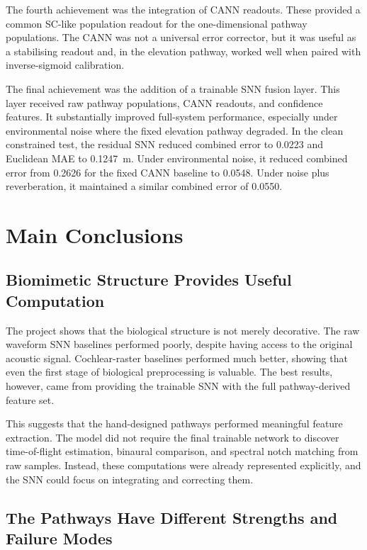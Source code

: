 The fourth achievement was the integration of CANN readouts. These provided a common SC-like population readout for the one-dimensional pathway populations. The CANN was not a universal error corrector, but it was useful as a stabilising readout and, in the elevation pathway, worked well when paired with inverse-sigmoid calibration.

The final achievement was the addition of a trainable SNN fusion layer. This layer received raw pathway populations, CANN readouts, and confidence features. It substantially improved full-system performance, especially under environmental noise where the fixed elevation pathway degraded. In the clean constrained test, the residual SNN reduced combined error to 0.0223 and Euclidean MAE to 0.1247~m. Under environmental noise, it reduced combined error from 0.2626 for the fixed CANN baseline to 0.0548. Under noise plus reverberation, it maintained a similar combined error of 0.0550.

\section{Main Conclusions}

\subsection{Biomimetic Structure Provides Useful Computation}

The project shows that the biological structure is not merely decorative. The raw waveform SNN baselines performed poorly, despite having access to the original acoustic signal. Cochlear-raster baselines performed much better, showing that even the first stage of biological preprocessing is valuable. The best results, however, came from providing the trainable SNN with the full pathway-derived feature set.

This suggests that the hand-designed pathways performed meaningful feature extraction. The model did not require the final trainable network to discover time-of-flight estimation, binaural comparison, and spectral notch matching from raw samples. Instead, these computations were already represented explicitly, and the SNN could focus on integrating and correcting them.

\subsection{The Pathways Have Different Strengths and Failure Modes}

